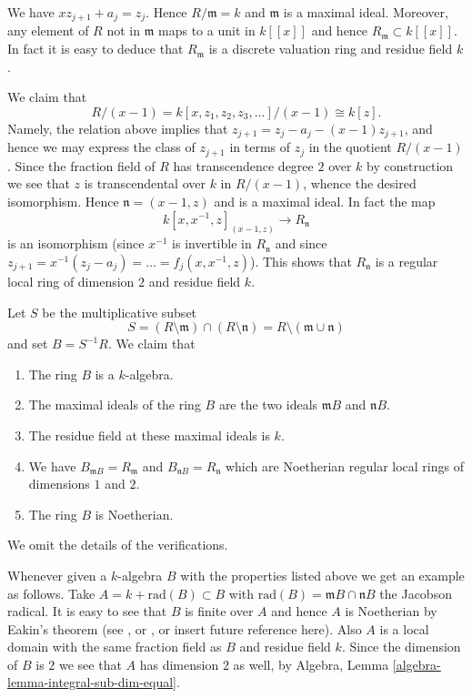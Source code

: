 \medskip\noindent
We have $xz_{j + 1} + a_j = z_j$. Hence $R/\mathfrak m = k$
and $\mathfrak m$ is a maximal ideal. Moreover, any element of $R$
not in $\mathfrak m$ maps to a unit in $k[[x]]$ and hence
$R_{\mathfrak m} \subset k[[x]]$. In fact it is easy to deduce
that $R_{\mathfrak m}$ is a discrete valuation ring and residue
field $k$.

\medskip\noindent
We claim that
$$
R/(x - 1) =
k[x, z_1, z_2, z_3, \ldots ]/(x - 1)
\cong
k[z].
$$
Namely, the relation above implies that
$z_{j + 1} = z_j - a_j - (x - 1)z_{j + 1}$, and hence
we may express the class of $z_{j + 1}$ in terms of $z_j$ in
the quotient $R/(x - 1)$. Since the fraction field of $R$
has transcendence degree $2$ over $k$ by construction we see that $z$ is
transcendental over $k$ in $R/(x - 1)$, whence the desired isomorphism.
Hence $\mathfrak n = (x - 1, z)$ and is a maximal ideal. In fact the
map
$$
k[x, x^{-1}, z]_{(x - 1, z)} \longrightarrow R_{\mathfrak n}
$$
is an isomorphism (since $x^{-1}$ is invertible in $R_{\mathfrak n}$
and since $z_{j + 1} = x^{-1}(z_j - a_j) = \ldots = f_j(x, x^{-1}, z)$).
This shows that $R_{\mathfrak n}$ is a regular local ring
of dimension $2$ and residue field $k$.

\medskip\noindent
Let $S$ be the multiplicative subset
$$
S =
(R \setminus \mathfrak m) \cap (R \setminus \mathfrak n) =
R \setminus (\mathfrak m \cup \mathfrak n)
$$
and set $B = S^{-1}R$. We claim that
\begin{enumerate}
\item The ring $B$ is a $k$-algebra.
\item The maximal ideals of the ring $B$ are the two ideals
$\mathfrak mB$ and $\mathfrak nB$.
\item The residue field at these maximal ideals is $k$.
\item We have $B_{\mathfrak mB} = R_{\mathfrak m}$
and $B_{\mathfrak nB} = R_{\mathfrak n}$
which are Noetherian regular local rings of dimensions $1$ and $2$.
\item The ring $B$ is Noetherian.
\end{enumerate}
We omit the details of the verifications.

\medskip\noindent
Whenever given a $k$-algebra $B$ with the properties listed above we
get an example as follows. Take $A = k + \text{rad}(B) \subset B$
with $\text{rad}(B) = \mathfrak mB \cap \mathfrak nB$ the Jacobson radical.
It is easy to see that $B$ is finite over $A$ and hence $A$ is
Noetherian by Eakin's theorem (see \cite{Eakin}, or
\cite[Appendix A1]{Nagata}, or insert future reference here).
Also $A$ is a local domain with the same fraction field as $B$ and
residue field $k$. Since the dimension of $B$ is $2$ we see that $A$
has dimension $2$ as well, by
Algebra, Lemma \ref{algebra-lemma-integral-sub-dim-equal}.

